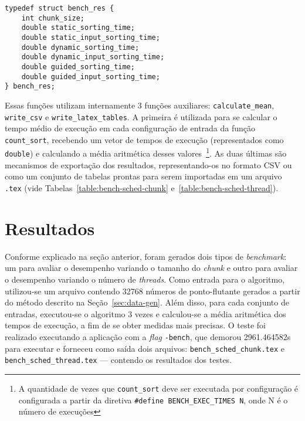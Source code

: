 \documentclass[12pt,a4paper]{article}
\begin{document}
\begin{verbatim}
typedef struct bench_res {
    int chunk_size;
    double static_sorting_time;
    double static_input_sorting_time;
    double dynamic_sorting_time;
    double dynamic_input_sorting_time;
    double guided_sorting_time;
    double guided_input_sorting_time;
} bench_res;
\end{verbatim}

Essas funções utilizam internamente 3 funções auxiliares:
\texttt{calculate\_mean}, \texttt{write\_csv} e \texttt{write\_latex\_tables}. A
primeira é utilizada para se calcular o tempo médio de execução em cada
configuração de entrada da função \texttt{count\_sort}, recebendo um vetor de
tempos de execução (representados como \texttt{double}) e calculando a média
aritmética desses valores~\footnote{A quantidade de vezes que
\texttt{count\_sort} deve ser executada por configuração é configurada a partir
da diretiva \texttt{\#define BENCH\_EXEC\_TIMES N}, onde N é o número de
execuções}. As duas últimas são mecanismos de exportação dos resultados,
representando-os no formato CSV ou como um conjunto de tabelas prontas para
serem importadas em um arquivo \texttt{.tex} (vide
Tabelas~\ref{table:bench-sched-chunk} e~\ref{table:bench-sched-thread}).
 
\section{Resultados}
Conforme explicado na seção anterior, foram gerados dois tipos de
\textit{benchmark}: um para avaliar o desempenho variando o tamanho do
\textit{chunk} e outro para avaliar o desempenho variando o número de
\textit{threads}. Como entrada para o algoritmo, utilizou-se um arquivo contendo
32768 números de ponto-flutante gerados a partir do método descrito na
Seção~\ref{sec:data-gen}. Além disso, para cada conjunto de entradas,
executou-se o algoritmo 3 vezes e calculou-se a média aritmética dos tempos de
execução, a fim de se obter medidas mais precisas. O teste foi realizado
executando a aplicação com a \textit{flag} \texttt{-bench}, que demorou
2961.464582s para executar e forneceu como saída dois arquivos:
\texttt{bench\_sched\_chunk.tex} e \texttt{bench\_sched\_thread.tex} ---
contendo os resultados dos testes.
\end{document}
